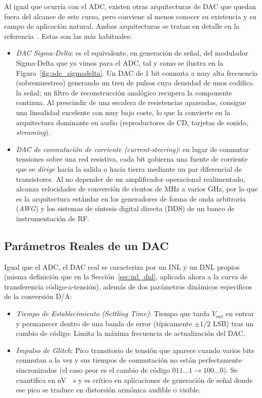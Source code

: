 Al igual que ocurría con el ADC, existen otras arquitecturas de DAC que quedan fuera del alcance de este curso, pero conviene al menos conocer su existencia y su campo de aplicación natural. Ambas arquitecturas se tratan en detalle en la referencia~\cite{kester2005dataconversion}. Estas son las más habituales:
\begin{itemize}
    \item \emph{DAC Sigma-Delta}: es el equivalente, en generación de señal, del modulador Sigma-Delta que ya vimos para el ADC, tal y como se ilustra en la Figura~\ref{fig:adc_sigmadelta}. Un DAC de 1 bit conmuta a muy alta frecuencia (sobremuestreo) generando un tren de pulsos cuya densidad de unos codifica la señal; un filtro de reconstrucción analógico recupera la componente continua. Al prescindir de una escalera de resistencias apareadas, consigue una linealidad excelente con muy bajo coste, lo que la convierte en la arquitectura dominante en audio (reproductores de CD, tarjetas de sonido, \textit{streaming}).
    \item \emph{DAC de conmutación de corriente (\textit{current-steering})}: en lugar de conmutar tensiones sobre una red resistiva, cada bit gobierna una fuente de corriente que se \emph{dirige} hacia la salida o hacia tierra mediante un par diferencial de transistores. Al no depender de un amplificador operacional realimentado, alcanza velocidades de conversión de cientos de \unit{MHz} a varios \unit{GHz}, por lo que es la arquitectura estándar en los generadores de forma de onda arbitraria (\textit{AWG}) y los sistemas de síntesis digital directa (DDS) de un banco de instrumentación de RF.
\end{itemize}


\subsection{Parámetros Reales de un DAC}\label{sec:dac_parametros}

Igual que el ADC, el DAC real se caracteriza por un INL y un DNL propios (misma definición que en la Sección~\ref{sec:inl_dnl}, aplicada ahora a la curva de transferencia código-a-tensión), además de dos parámetros dinámicos específicos de la conversión D/A:

\begin{itemize}
    \item \emph{Tiempo de Establecimiento (\textit{Settling Time})}: Tiempo que tarda $V_{out}$ en entrar y permanecer dentro de una banda de error (típicamente $\pm 1/2$ LSB) tras un cambio de código. Limita la máxima frecuencia de actualización del DAC.
    \item \emph{Impulso de \textit{Glitch}}: Pico transitorio de tensión que aparece cuando varios bits conmutan a la vez y sus tiempos de conmutación no están perfectamente sincronizados (el caso peor es el cambio de código $011\ldots1 \to 100\ldots0$). Se cuantifica en \unit{nV\text{-}s} y es crítico en aplicaciones de generación de señal donde ese pico se traduce en distorsión armónica audible o visible.
\end{itemize}

